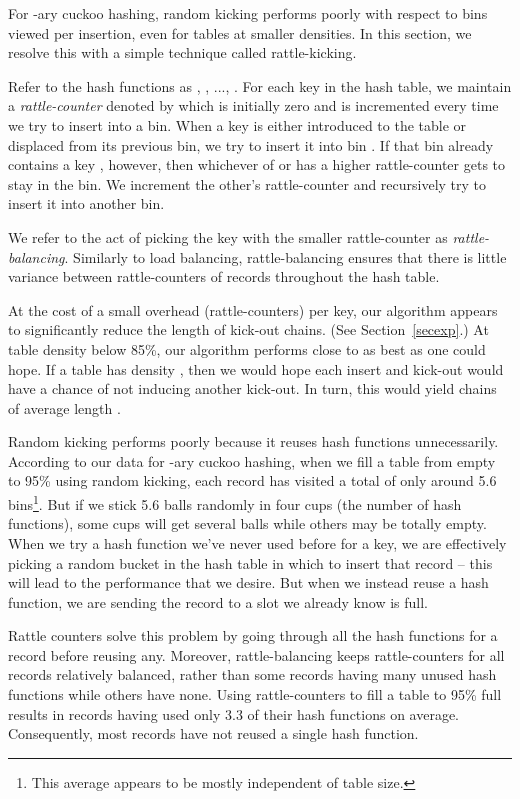 \documentclass{sig-alternate-05-2015}
\begin{document}
For -ary cuckoo hashing, random kicking performs poorly with
respect to bins viewed per insertion, even for tables at smaller
densities. In this section, we resolve this with a simple technique
called rattle-kicking.

Refer to the  hash functions as , , ..., . For
each key  in the hash table, we maintain a \emph{rattle-counter}
denoted by  which is initially zero and is incremented every
time we try to insert  into a bin. When a key  is either
introduced to the table or displaced from its previous bin, we try to
insert it into bin . If that bin already contains a
key , however, then whichever of  or  has a higher
rattle-counter gets to stay in the bin. We increment the other's
rattle-counter and recursively try to insert it into another bin.



We refer to the act of picking the key with the smaller rattle-counter
as \emph{rattle-balancing}. Similarly to load balancing,
rattle-balancing ensures that there is little variance between
rattle-counters of records throughout the hash table.

At the cost of a small overhead (rattle-counters) per key, our
algorithm appears to significantly reduce the length of kick-out
chains. (See Section~\ref{secexp}.) At table density below 85\%, our
algorithm performs close to as best as one could hope. If a table has
density , then we would hope each insert and kick-out would
have a  chance of not inducing another kick-out. In turn,
this would yield chains of average length .

Random kicking performs poorly because it reuses hash functions
unnecessarily.  According to our data for -ary cuckoo hashing, when
we fill a table from empty to 95\% using random kicking, each record
has visited a total of only around 5.6 bins\footnote{This average
  appears to be mostly independent of table size.}. But if we stick
5.6 balls randomly in four cups (the number of hash functions), some
cups will get several balls while others may be totally empty. When we
try a hash function we've never used before for a key, we are
effectively picking a random bucket in the hash table in which to
insert that record -- this will lead to the  performance that
we desire. But when we instead reuse a hash function, we are sending
the record to a slot we already know is full.

Rattle counters solve this problem by going through all the hash
functions for a record before reusing any. Moreover, rattle-balancing
keeps rattle-counters for all records relatively balanced, rather than
some records having many unused hash functions while others have
none. Using rattle-counters to fill a table to 95\% full results in
records having used only 3.3 of their hash functions on
average. Consequently, most records have not reused a single hash
function.
\end{document}
